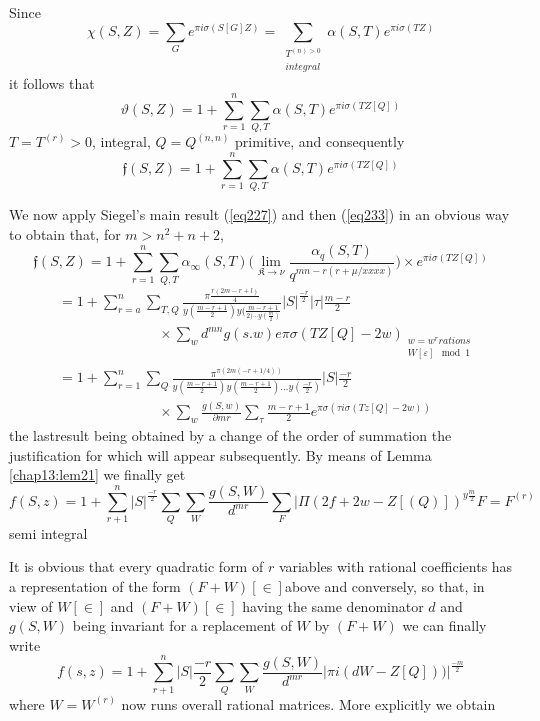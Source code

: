 Since
$$
\chi (S, Z) = \sum_G e^{\pi i \sigma (S[G]Z)} = \sum_{\substack{T^{(n)
      > 0}\\ integral }} \alpha(S, T) e^{\pi i \sigma (TZ)} 
$$
it follows that 
\begin{equation*}
\vartheta(S, Z) = 1 + \sum^n_{r =1} \sum_{Q, T} \alpha (S, T) e^{\pi i
  \sigma (TZ[Q])} \tag{241}\label{eq241}  
\end{equation*}
\hspace{4cm} $T = T^{(r)} > 0$, integral, $Q = Q^{(n , n)}$ primitive,
and consequently 
$$
\mathfrak{f}(S, Z) =  1 + \sum^n_{r =1} \sum_{Q, T} \alpha (S, T)
e^{\pi i \sigma (TZ[Q])}  
$$

We now apply Siegel's main result (\ref{eq227}) and then (\ref{eq233}) in an
obvious way to obtain that, for $m > n^2 + n +2$, 
$$
\mathfrak{f}(S, Z) = 1 + \sum^n_{r =1} \sum_{Q, T} \alpha_\infty (S,
T) \bigg(\lim_{\mathfrak{K} \to \nu} \frac{\alpha_q (S, T)}{q^{m n - r (r + \mu /
    xxxx)}} \bigg) \times e^{\pi i \sigma (TZ[Q])}  
$$ 
\begin{align*}
& = 1 + \sum^n_{r = a} \sum_{T, Q} \frac{\pi \frac{r (2 m -r + l
      )}{4}}{y (\frac{m - r + 1}{2}) y (\frac{m - r + 1}{2)
      \cdots y (\frac{m}{2})}} |S|^{\frac{- r}{2}} |\tau|\frac{m
    - r}{2} \\
& \hspace{3cm} \times \sum_w d ^{mn} g (s . w) e \pi \sigma (T Z [Q] - 2w)
  _{\substack{ w = w^{r} rations \\ W [\varepsilon] \mod 1}}\\ 
& = 1 + \sum^{n}_{ r = 1} \sum_Q \frac{\pi ^{ \pi (2m (- r + 1/4
))}}{ y (\frac{m - r + 1}{2})y (\frac{m - r + 1}{2}) \ldots
    y (\frac{-r}{2})}|S| \frac{- r}{2} \\
& \hspace{3cm} \times \sum_w \frac{g (S,
    w)}{\partial m r} \sum_\tau \frac{m - r + 1}{2} e^{\pi \sigma
    (\tau i \sigma (Tz [Q] - 2w))} 
\end{align*}
the last\pageoriginale result being obtained by a change of the order
of summation the justification for which will appear subsequently. By
means of Lemma \ref{chap13:lem21} we finally get   
$$
f (S, z) = 1 + \sum^n_{r + 1} |S| ^{\frac{-r}{2}} \sum_Q\sum_W \frac{g
  (S, W)}{d ^ {mr}} \sum_F | \Pi (2f + 2w - Z [(Q)])^{y\frac 
{m}{2}}
 F = F ^{(r)} 
$$
semi integral 

It is obvious that every quadratic form of $r$ variables with rational
coefficients has a representation of the form $(F +
W)[\in]$above and conversely, so that, in view of
$W[\in]$ and $( F + W) [\in]$ having the same
denominator $d$ and $g (S, W)$ being invariant for a replacement of
$W$ by $(F + W)$ we can finally write  
\begin{equation*}
f (s, z) = 1 + \sum_{ r + 1}^ n |S|\frac{- r}{2} \sum_Q \sum_W
\frac{g(S , W)}{d^{mr}}|\pi i (d W - Z [Q]))|^{\frac{-m}{2}}
\tag{242}\label{eq242}   
\end{equation*}
where $ W = W^{(r)}$ now runs overall rational matrices. More
explicitly we obtain\pageoriginale  

